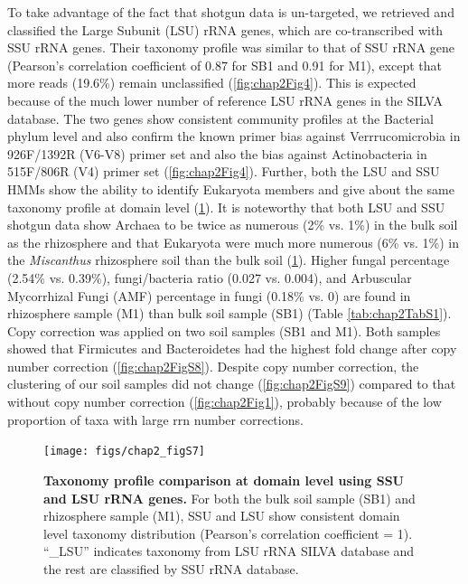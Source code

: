 \documentclass[]{msu-thesis}
\begin{document}
To take advantage of the fact that shotgun data is un-targeted, we retrieved and classified the Large Subunit (LSU) rRNA genes, which are co-transcribed with SSU rRNA genes. Their taxonomy profile was similar to that of SSU rRNA gene (Pearson’s correlation coefficient of 0.87 for SB1 and 0.91 for M1), except that more reads (19.6\%) remain unclassified (\cref{fig:chap2Fig4}). This is expected because of the much lower number of reference LSU rRNA genes in the SILVA database. The two genes show consistent community profiles at the Bacterial phylum level and also confirm the known primer bias against Verrrucomicrobia in 926F/1392R (V6-V8) primer set and also the bias against Actinobacteria in 515F/806R (V4) primer set (\cref{fig:chap2Fig4}). Further, both the LSU and SSU HMMs show the ability to identify Eukaryota members and give about the same taxonomy profile at domain level (\cref{fig:chap2FigS7}). It is noteworthy that both LSU and SSU shotgun data show Archaea to be twice as numerous (2\% vs. 1\%) in the bulk soil as the rhizosphere and that Eukaryota were much more numerous (6\% vs. 1\%) in the \textit{Miscanthus} rhizosphere soil than the bulk soil (\cref{fig:chap2FigS7}). Higher fungal percentage (2.54\% vs. 0.39\%), fungi/bacteria ratio (0.027 vs. 0.004), and Arbuscular Mycorrhizal Fungi (AMF) percentage in fungi (0.18\% vs. 0) are found in rhizosphere sample (M1) than bulk soil sample (SB1) (Table \ref{tab:chap2TabS1}). Copy correction was applied on two soil samples (SB1 and M1). Both samples showed that Firmicutes and Bacteroidetes had the highest fold change after copy number correction (\cref{fig:chap2FigS8}). Despite copy number correction, the clustering of our soil samples did not change (\cref{fig:chap2FigS9}) compared to that without copy number correction (\cref{fig:chap2Fig1}), probably because of the low proportion of taxa with large rrn number corrections.


\begin{figure}[tbph!]
  \centering
  \texttt{[image: figs/chap2\_figS7]}
  \caption[Taxonomy profile comparison at domain level using SSU and LSU rRNA genes]{\textbf{Taxonomy profile comparison at domain level using SSU and LSU rRNA genes.} For both the bulk soil sample (SB1) and rhizosphere sample (M1), SSU and LSU show consistent domain level taxonomy distribution (Pearson’s correlation coefficient = 1). ``\_LSU'' indicates taxonomy from LSU rRNA SILVA database and the rest are classified by SSU rRNA database.}
  \label{fig:chap2FigS7}
\end{figure}
\end{document}
